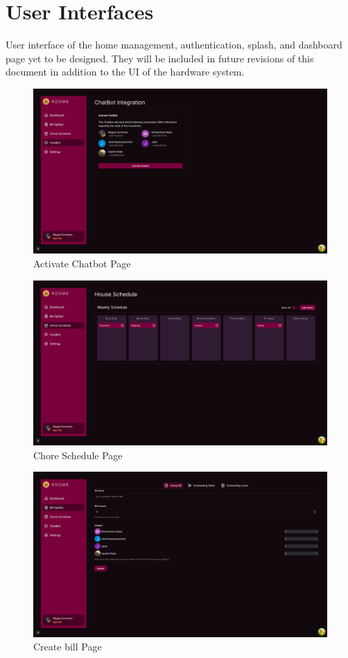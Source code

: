 \documentclass[12pt, titlepage]{article}
\begin{document}
\section{User Interfaces}
User interface of the home management, authentication, splash, and dashboard page yet to be designed. They will be included in future revisions of this document in addition to the UI of the hardware system.


\begin{figure}[H]
  \centering
  \includegraphics[width=\textwidth]{chatbot.png}
  \caption{Activate Chatbot Page}
  \label{fig:landing}
\end{figure}
\begin{figure}[H]
  \centering
  \includegraphics[width=\textwidth]{choreSchedule.png}
  \caption{Chore Schedule Page}
  \label{fig:landing}
\end{figure}
\begin{figure}[H]
  \centering
  \includegraphics[width=\textwidth]{createBill.png}
  \caption{Create bill Page}
  \label{fig:landing}
\end{figure}
\end{document}
